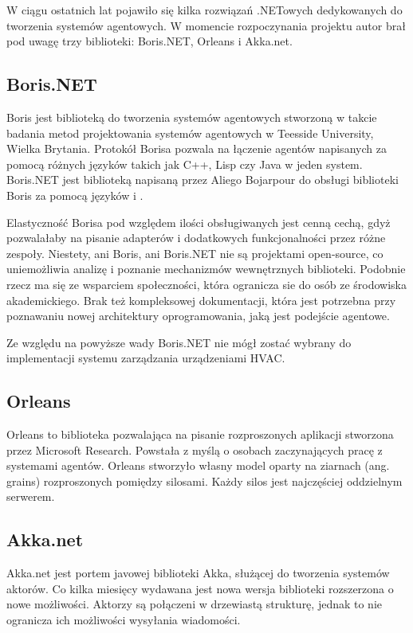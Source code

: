 W ciągu ostatnich lat pojawiło się kilka rozwiązań .NETowych dedykowanych do tworzenia systemów agentowych. W momencie rozpoczynania projektu autor brał pod uwagę trzy biblioteki: Boris.NET, Orleans i Akka.net.

\subsection{Boris.NET}
Boris jest biblioteką do tworzenia systemów agentowych stworzoną w takcie badania metod projektowania systemów agentowych w Teesside University, Wielka Brytania. Protokół Borisa pozwala na łączenie agentów napisanych za pomocą różnych języków takich jak C++, Lisp czy Java w jeden system. Boris.NET jest biblioteką napisaną przez Aliego Bojarpour do obsługi biblioteki Boris za pomocą języków \csh i \fsh. 

Elastyczność Borisa pod względem ilości obsługiwanych jest cenną cechą, gdyż pozwalałaby na pisanie adapterów i dodatkowych funkcjonalności przez różne zespoły. 
Niestety, ani Boris, ani Boris.NET nie są projektami open-source, co uniemożliwia analizę i poznanie mechanizmów wewnętrznych biblioteki. Podobnie rzecz ma się ze wsparciem społeczności, która ogranicza sie do osób ze środowiska akademickiego. Brak też kompleksowej dokumentacji, która jest potrzebna przy poznawaniu nowej architektury oprogramowania, jaką jest podejście agentowe.

Ze względu na powyższe wady Boris.NET nie mógł zostać wybrany do implementacji systemu zarządzania urządzeniami HVAC.

\subsection{Orleans}
Orleans to biblioteka pozwalająca na pisanie rozproszonych aplikacji stworzona przez Microsoft Research.
Powstała z myślą o osobach zaczynających pracę z systemami agentów. 
Orleans stworzyło własny model oparty na ziarnach (ang. grains) rozproszonych pomiędzy silosami. Każdy silos jest najczęściej oddzielnym serwerem.
  
\subsection{Akka.net}
Akka.net jest portem javowej biblioteki Akka, służącej do tworzenia systemów aktorów. 
Co kilka miesięcy wydawana jest nowa wersja biblioteki rozszerzona o nowe możliwości. 
Aktorzy są połączeni w drzewiastą strukturę, jednak to nie ogranicza ich możliwości wysyłania wiadomości. 

